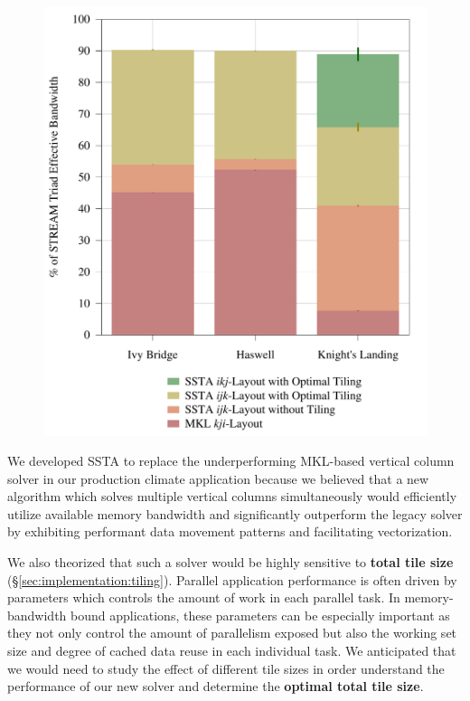 \documentclass{sig-alternate-05-2015}
\begin{document}
\begin{figure}[!bth]
\begin{minipage}{0.49\textwidth}
    \includegraphics[width=0.95\columnwidth]{figures/post_tsb_impact_of_optimizations_histogram_09_03_2016_09_04_2016_1socket.pdf}
  \end{minipage}
\end{figure}

We developed SSTA to replace the underperforming MKL-based vertical column
  solver in our production climate application because we believed that a new
  algorithm which solves multiple vertical columns simultaneously would
  efficiently utilize available memory bandwidth and significantly outperform the
  legacy solver by exhibiting performant data movement patterns and facilitating
  vectorization.

We also theorized that such a solver would be highly sensitive to
  \textbf{total tile size} (\S\ref{sec:implementation:tiling}).
Parallel application performance is often driven by parameters which controls
  the amount of work in each parallel task.
In memory-bandwidth bound applications, these parameters can be especially important
  as they not only control the amount of parallelism exposed but also the working
  set size and degree of cached data reuse in each individual task.
We anticipated that we would need to study the effect of different tile sizes
  in order understand the performance of our new solver and determine the
  \textbf{optimal total tile size}.
\end{document}

